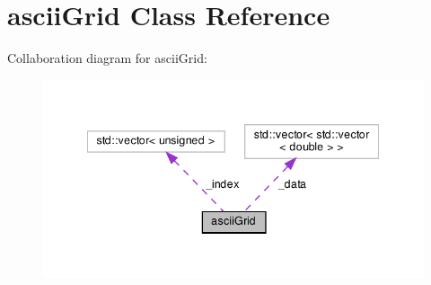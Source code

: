 \hypertarget{classasciiGrid}{}\section{ascii\+Grid Class Reference}
\label{classasciiGrid}


Collaboration diagram for ascii\+Grid\+:\nopagebreak
\begin{figure}[H]
\begin{center}
\leavevmode
\includegraphics[width=342pt]{classasciiGrid__coll__graph}
\end{center}
\end{figure}
